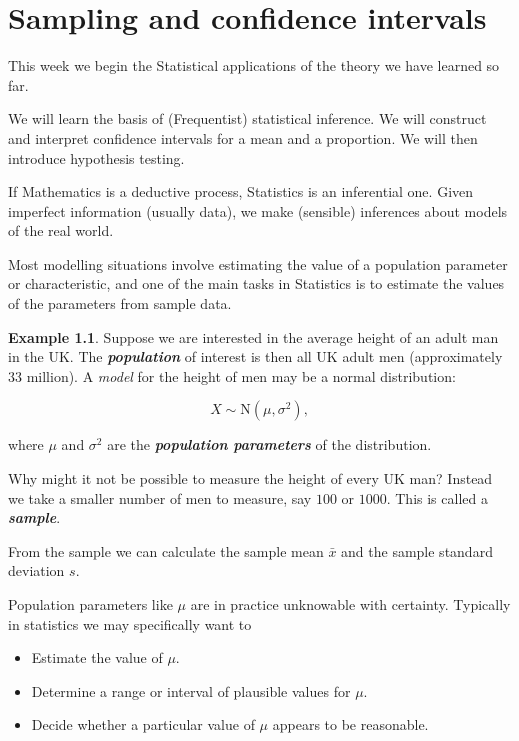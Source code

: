 \documentclass[
]{book}
\theoremstyle{definition}
\theoremstyle{definition}
\newtheorem{example}{Example}[chapter]
\theoremstyle{definition}
\theoremstyle{definition}
\theoremstyle{remark}
\begin{document}
\hypertarget{sampling-and-confidence-intervals}{%
\chapter{Sampling and confidence intervals}\label{sampling-and-confidence-intervals}}

This week we begin the Statistical applications of the theory we have learned so far.

We will learn the basis of (Frequentist) statistical inference. We will construct and interpret confidence intervals for a mean and a proportion. We will then introduce hypothesis testing.

If Mathematics is a deductive process, Statistics is an inferential one. Given imperfect information (usually data), we make (sensible) inferences about models of the real world.

Most modelling situations involve estimating the value of a population parameter or characteristic, and one of the main tasks in Statistics is to estimate the values of the parameters from sample data.

\begin{example}
Suppose we are interested in the average height of an adult man in the UK. The \textbf{\emph{population}} of interest is then all UK adult men (approximately \(33\) million). A \emph{model} for the height of men may be a normal distribution:

\[X\sim \text{N}(\mu,\sigma^2),\]

where \(\mu\) and \(\sigma^2\) are the \textbf{\emph{population parameters}} of the distribution.

Why might it not be possible to measure the height of every UK man? Instead we take a smaller number of men to measure, say \(100\) or \(1000\). This is called a \textbf{\emph{sample}}.

From the sample we can calculate the sample mean \(\bar{x}\) and the sample standard deviation \(s\).
\end{example}

Population parameters like \(\mu\) are in practice unknowable with certainty. Typically in statistics we may specifically want to

\begin{itemize}
\item
  Estimate the value of \(\mu\).
\item
  Determine a range or interval of plausible values for \(\mu\).
\item
  Decide whether a particular value of \(\mu\) appears to be reasonable.
\end{itemize}
\end{document}
